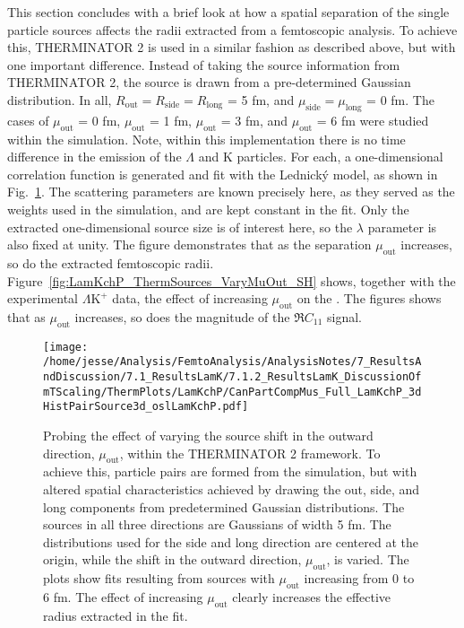 \documentclass[ALICE,manyauthors]{cernphprep}
\newcommand{\Lam}{$\Lambda$\xspace}
\newcommand{\LamKchP}{$\Lambda\mathrm{K^{+}}$\xspace}
\begin{document}
This section concludes with a brief look at how a spatial separation of the single particle sources affects the radii extracted from a femtoscopic analysis.
To achieve this, THERMINATOR 2 is used in a similar fashion as described above, but with one important difference.
Instead of taking the source information from THERMINATOR 2, the source is drawn from a pre-determined Gaussian distribution.
In all, $R_{\mathrm{out}} = R_{\mathrm{side}} = R_{\mathrm{long}}$ = 5 fm, and $\mu_{\mathrm{side}} = \mu_{\mathrm{long}}$ = 0 fm.
The cases of $\mu_{\mathrm{out}}$ = 0 fm, $\mu_{\mathrm{out}}$ = 1 fm, $\mu_{\mathrm{out}}$ = 3 fm, and $\mu_{\mathrm{out}}$ = 6 fm were studied within the simulation.
Note, within this implementation there is no time difference in the emission of the \Lam and K particles.
For each, a one-dimensional correlation function is generated and fit with the Lednick\'y model, as shown in Fig.~\ref{fig:LamKchP_ThermSources_VaryMuOut}.
The scattering parameters are known precisely here, as they served as the weights used in the simulation, and are kept constant in the fit.
Only the extracted one-dimensional source size is of interest here, so the $\lambda$ parameter is also fixed at unity.
The figure demonstrates that as the separation $\mu_{\mathrm{out}}$ increases, so do the extracted femtoscopic radii.
Figure~\ref{fig:LamKchP_ThermSources_VaryMuOut_SH} shows, together with the experimental \LamKchP data, the effect of increasing $\mu_{\mathrm{out}}$ on the {} {}.
The figures shows that as $\mu_{\mathrm{out}}$ increases, so does the magnitude of the $\Re C_{11}$ signal.


\begin{figure}[h]
  \centering
  \texttt{[image: /home/jesse/Analysis/FemtoAnalysis/AnalysisNotes/7\_ResultsAndDiscussion/7.1\_ResultsLamK/7.1.2\_ResultsLamK\_DiscussionOfmTScaling/ThermPlots/LamKchP/CanPartCompMus\_Full\_LamKchP\_3dHistPairSource3d\_oslLamKchP.pdf]}
  \caption[Varying $\mu_{\mathrm{Out}}$ with THERMINATOR 2]
  {
  Probing the effect of varying the source shift in the outward direction, $\mu_{\mathrm{out}}$, within the THERMINATOR 2 framework.  
  To achieve this, particle pairs are formed from the simulation, but with altered spatial characteristics achieved by drawing the out, side, and long components from predetermined Gaussian distributions.  
  The sources in all three directions are Gaussians of width 5 fm.
  The distributions used for the side and long direction are centered at the origin, while the shift in the outward direction, $\mu_{\mathrm{out}}$, is varied.
  The plots show fits resulting from sources with $\mu_{\mathrm{out}}$ increasing from 0 to 6 fm. 
  The effect of increasing $\mu_{\mathrm{out}}$ clearly increases the effective radius extracted in the fit.
  }
  \label{fig:LamKchP_ThermSources_VaryMuOut}
\end{figure}
\end{document}
